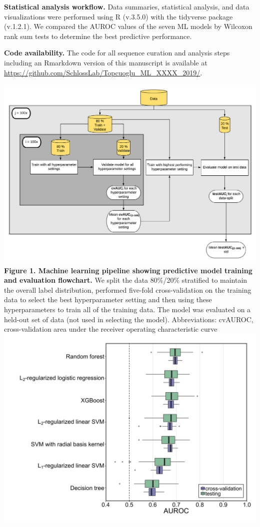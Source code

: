 \documentclass[11pt,]{article}
\begin{document}
\textbf{Statistical analysis workflow.} Data summaries, statistical
analysis, and data visualizations were performed using R (v.3.5.0) with
the tidyverse package (v.1.2.1). We compared the AUROC values of the
seven ML models by Wilcoxon rank sum tests to determine the best
predictive performance.

\textbf{Code availability.} The code for all sequence curation and
analysis steps including an Rmarkdown version of this manuscript is
available at
\url{https://github.com/SchlossLab/Topcuoglu_ML_XXXX_2019/}.

\newpage

\includegraphics{Figure_1} \textbf{Figure 1. Machine learning pipeline
showing predictive model training and evaluation flowchart. } We split
the data 80\%/20\% stratified to maintain the overall label
distribution, performed five-fold cross-validation on the training data
to select the best hyperparameter setting and then using these
hyperparameters to train all of the training data. The model was
evaluated on a held-out set of data (not used in selecting the model).
Abbreviations: cvAUROC, cross-validation area under the receiver
operating characteristic curve \newpage
\includegraphics{Figure_2.png}
\end{document}
